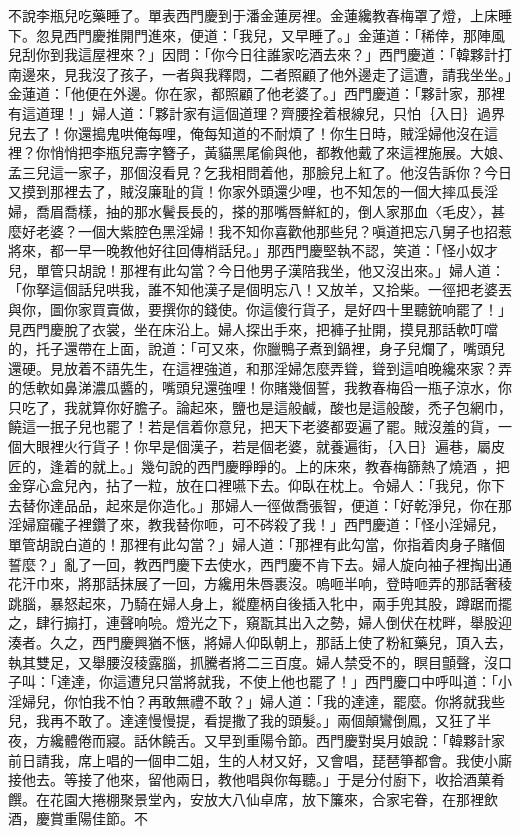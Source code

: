 不說李瓶兒吃藥睡了。單表西門慶到于潘金蓮房裡。金蓮纔教春梅罩了燈，上床睡下。忽見西門慶推開門進來，便道：「我兒，又早睡了。」金蓮道：「稀倖，那陣風兒刮你到我這屋裡來？」因問：「你今日往誰家吃酒去來？」西門慶道：「韓夥計打南邊來，見我沒了孩子，一者與我釋悶，二者照顧了他外邊走了這遭，請我坐坐。」金蓮道：「他便在外邊。你在家，都照顧了他老婆了。」西門慶道：「夥計家，那裡有這道理！」婦人道：「夥計家有這個道理？齊腰拴着根線兒，只怕｛入日｝過界兒去了！你還搗鬼哄俺每哩，俺每知道的不耐煩了！你生日時，賊淫婦他沒在這裡？你悄悄把李瓶兒壽字簪子，黃貓黑尾偷與他，都教他戴了來這裡施展。大娘、孟三兒這一家子，那個沒看見？乞我相問着他，那臉兒上紅了。他沒告訴你？今日又摸到那裡去了，賊沒廉耻的貨！你家外頭還少哩，也不知怎的一個大摔瓜長淫婦，喬眉喬樣，抽的那水鬢長長的，搽的那嘴唇鮮紅的，倒人家那血〈毛皮〉，甚麼好老婆？一個大紫腔色黑淫婦！我不知你喜歡他那些兒？嗔道把忘八舅子也招惹將來，都一早一晚教他好往回傳梢話兒。」那西門慶堅執不認，笑道：「怪小奴才兒，單管只胡說！那裡有此勾當？今日他男子漢陪我坐，他又沒出來。」婦人道：「你拏這個話兒哄我，誰不知他漢子是個明忘八！又放羊，又拾柴。一徑把老婆丟與你，圖你家買賣做，要撰你的錢使。你這傻行貨子，是好四十里聽銃响罷了！」見西門慶脫了衣裳，坐在床沿上。婦人探出手來，把褲子扯開，摸見那話軟叮噹的，托子還帶在上面，說道：「可又來，你臘鴨子煮到鍋裡，身子兒爛了，嘴頭兒還硬。見放着不語先生，在這裡強道，和那淫婦怎麼弄聳，聳到這咱晚纔來家？弄的恁軟如鼻涕濃瓜醬的，嘴頭兒還強哩！你賭幾個誓，我教春梅舀一瓶子涼水，你只吃了，我就算你好膽子。論起來，鹽也是這般鹹，酸也是這般酸，禿子包網巾，饒這一抿子兒也罷了！若是信着你意兒，把天下老婆都耍遍了罷。賊沒羞的貨，一個大眼裡火行貨子！你早是個漢子，若是個老婆，就養遍街，｛入日｝遍巷，屬皮匠的，逢着的就上。」幾句說的西門慶睜睜的。上的床來，教春梅篩熱了燒酒 ，把金穿心盒兒內，拈了一粒，放在口裡嚥下去。仰臥在枕上。令婦人：「我兒，你下去替你達品品，起來是你造化。」那婦人一徑做喬張智，便道：「好乾淨兒，你在那淫婦窟礲子裡鑽了來，教我替你咂，可不硶殺了我！」西門慶道：「怪小淫婦兒，單管胡說白道的！那裡有此勾當？」婦人道：「那裡有此勾當，你指着肉身子賭個誓麼？」亂了一回，教西門慶下去使水，西門慶不肯下去。婦人旋向袖子裡掏出通花汗巾來，將那話抹展了一回，方纔用朱唇裹沒。嗚咂半响，登時咂弄的那話奢稜跳腦，暴怒起來，乃騎在婦人身上，縱塵柄自後插入牝中，兩手兜其股，蹲踞而擺之，肆行搧打，連聲响喨。燈光之下，窺翫其出入之勢，婦人倒伏在枕畔，舉股迎湊者。久之，西門慶興猶不愜，將婦人仰臥朝上，那話上使了粉紅藥兒，頂入去，執其雙足，又舉腰沒稜露腦，抓騰者將二三百度。婦人禁受不的，瞑目顫聲，沒口子叫：「達達，你這遭兒只當將就我，不使上他也罷了！」西門慶口中呼叫道：「小淫婦兒，你怕我不怕？再敢無禮不敢？」婦人道：「我的達達，罷麼。你將就我些兒，我再不敢了。達達慢慢提，看提撒了我的頭髮。」兩個顛鸞倒鳳，又狂了半夜，方纔體倦而寢。話休饒舌。又早到重陽令節。西門慶對吳月娘說：「韓夥計家前日請我，席上唱的一個申二姐，生的人材又好，又會唱，琵琶箏都會。我使小廝接他去。等接了他來，留他兩日，教他唱與你每聽。」于是分付廚下，收拾酒菓肴饌。在花園大捲棚聚景堂內，安放大八仙卓席，放下簾來，合家宅眷，在那裡飲酒，慶賞重陽佳節。不